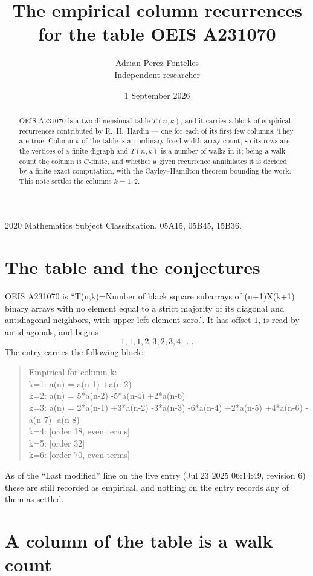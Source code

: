 \documentclass[11pt,a4paper]{article}
\title{The empirical column recurrences for the table OEIS A231070}
\author{Adrian Perez Fontelles\\ \small Independent researcher}
\date{1 September 2026}
\theoremstyle{plain}
\theoremstyle{definition}
\begin{document}
\maketitle

\begin{abstract}
OEIS A231070 is a two-dimensional table $T(n,k)$, and it carries a block of empirical
recurrences contributed by R.~H.~Hardin --- one for each of its first few columns. They are
true. Column $k$ of the table is an ordinary fixed-width array count, so its rows are the
vertices of a finite digraph and $T(n,k)$ is a number of walks in it; being a walk count the
column is $C$-finite, and whether a given recurrence annihilates it is decided by a finite
exact computation, with the Cayley--Hamilton theorem bounding the work. This note settles the columns $k=1, 2$.
\end{abstract}

\noindent\small 2020 Mathematics Subject Classification. 05A15, 05B45, 15B36.\normalsize

\section{The table and the conjectures}

OEIS A231070 is ``T(n,k)=Number of black square subarrays of (n+1)X(k+1) binary arrays with no element equal to a strict majority of its diagonal and antidiagonal neighbors, with upper left element zero.''. It has offset $1$, is
read by antidiagonals, and begins
\[
1, 1, 1, 2, 3, 2, 3, 4,\ \dots
\]
The entry carries the following block:
\begin{quote}\small
Empirical for column k:\\
k=1: a(n) = a(n-1) +a(n-2)\\
k=2: a(n) = 5*a(n-2) -5*a(n-4) +2*a(n-6)\\
k=3: a(n) = 2*a(n-1) +3*a(n-2) -3*a(n-3) -6*a(n-4) +2*a(n-5) +4*a(n-6) -a(n-7) -a(n-8)\\
k=4: [order 18, even terms]\\
k=5: [order 32]\\
k=6: [order 70, even terms]\\
\end{quote}
As of the ``Last modified'' line on the live entry (Jul 23 2025 06:14:49, revision 6) these are still
recorded as empirical, and nothing on the entry records any of them as settled.

\section{A column of the table is a walk count}
\end{document}
